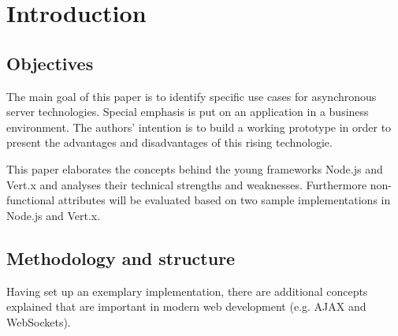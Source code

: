 \listoftables
{}
\newpage


\listoffigures
{}
\newpage

\lstlistoflistings
{}
\newpage

\renewcommand{\thepage}{\arabic{page}}

\setcounter{page}{1} 

\renewcommand{\baselinestretch}{1.4}\normalsize

\section{Introduction}

\subsection{Objectives}
The main goal of this paper is to identify specific use cases for asynchronous server
technologies. Special emphasis is put on an application in a business environment. 
The authors' intention is to build a working prototype in order to present the advantages and
disadvantages of this rising technologie.

This paper elaborates the concepts behind the young frameworks Node.js and Vert.x and analyses their 
technical strengths and weaknesses. Furthermore non-functional attributes will be
evaluated based on two sample implementations in Node.js  and Vert.x.

\subsection{Methodology and structure}

Having set up an exemplary implementation, there are additional concepts explained that are important in modern web development (e.g. AJAX and WebSockets).

